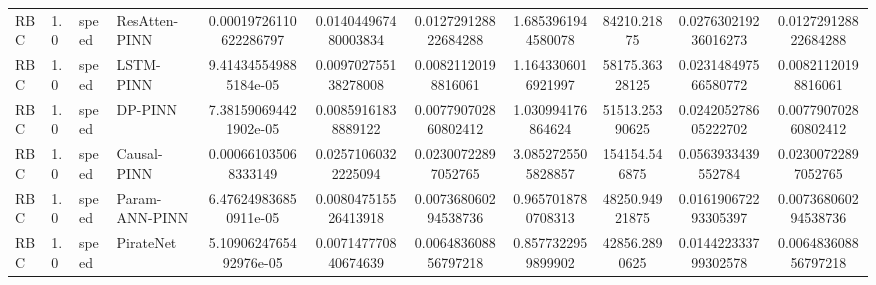 \begin{landscape}
\begin{table}[p]
{\begin{tabular}{llllccccccc}
RBC &    1.0 & speed &  ResAtten-PINN & 0.00019726110622286797 &   0.014044967480003834 &   0.012729128822684288 &   1.6853961944580078 &           84210.21875 &  0.027630219236016273 &   0.012729128822684288 \\
RBC &    1.0 & speed &      LSTM-PINN &  9.414345549885184e-05 &   0.009702755138278008 &    0.00821120198816061 &   1.1643306016921997 &        58175.36328125 &  0.023148497566580772 &    0.00821120198816061 \\
RBC &    1.0 & speed &        DP-PINN &  7.381590694421902e-05 &    0.00859161838889122 &   0.007790702860802412 &    1.030994176864624 &        51513.25390625 &  0.024205278605222702 &   0.007790702860802412 \\
RBC &    1.0 & speed &    Causal-PINN &   0.000661035068333149 &    0.02571060322225094 &    0.02300722897052765 &   3.0852725505828857 &         154154.546875 &    0.0563933439552784 &    0.02300722897052765 \\
RBC &    1.0 & speed & Param-ANN-PINN &  6.476249836850911e-05 &   0.008047515526413918 &   0.007368060294538736 &   0.9657018780708313 &        48250.94921875 &  0.016190672293305397 &   0.007368060294538736 \\
RBC &    1.0 & speed &      PirateNet & 5.1090624765492976e-05 &   0.007147770840674639 &   0.006483608856797218 &   0.8577322959899902 &         42856.2890625 &  0.014422333799302578 &   0.006483608856797218 \\
\bottomrule
\end{tabular}%
}
\end{table}
\end{landscape}
